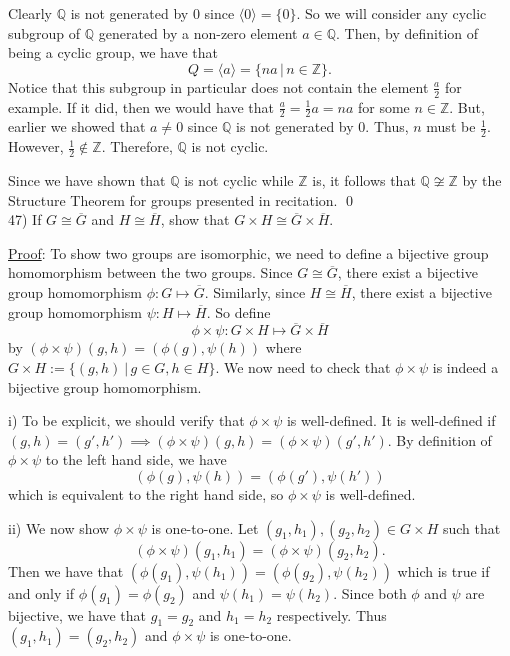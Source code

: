 \documentclass{article}
\begin{document}
Clearly $\mathbb{Q}$ is not generated by $0$ since $\langle 0 \rangle = \{ 0 \}$. So we will consider any cyclic subgroup of $\mathbb{Q}$ generated by a non-zero element $a \in \mathbb{Q}$. Then, by definition of being a cyclic group, we have that 
$$Q = \langle a \rangle = \{ na \, \vert\, n \in \mathbb{Z} \}.$$
Notice that this subgroup in particular does not contain the element $\frac{a}{2}$ for example. If it did, then we would have that $\frac{a}{2} = \frac{1}{2}a = na$ for some $n \in \mathbb{Z}$. But, earlier we showed that $a \neq 0$ since $\mathbb{Q}$ is not generated by $0$. Thus, $n$ must be $\frac{1}{2}$. However, $\frac{1}{2} \not \in \mathbb{Z}$. Therefore, $\mathbb{Q}$ is not cyclic.

Since we have shown that $\mathbb{Q}$ is not cyclic while $\mathbb{Z}$ is, it follows that $\mathbb{Q} \not \cong \mathbb{Z}$ by the Structure Theorem for groups presented in recitation. \qed \\

47) If $G \cong \overline{G}$ and $H \cong \overline{H}$, show that $G \times H \cong \overline{G} \times \overline{H}.$

\underline{Proof}: To show two groups are isomorphic, we need to define a bijective group homomorphism between the two groups.  Since $G \cong \overline{G}$, there exist a bijective group homomorphism $\phi : G \mapsto \overline{G}$. Similarly, since $H \cong \overline{H}$, there exist a bijective group homomorphism $\psi : H \mapsto \overline{H}$. So define 
$$\phi \times \psi : G \times H \mapsto \overline{G} \times \overline{H}$$
by $(\phi \times \psi)(g, h) = (\phi(g), \psi(h))$ where $G \times H := \{ (g,h) \ \vert\, g \in G, h \in H \}$. We now need to check that $\phi \times \psi$ is indeed a bijective group homomorphism.

i) To be explicit, we should verify that $\phi \times \psi$ is well-defined. It is well-defined if $(g, h) = (g', h') \implies (\phi \times \psi)(g, h) = (\phi \times \psi)(g', h').$ By definition of $\phi \times \psi$ to the left hand side, we have
$$(\phi(g), \psi(h)) = (\phi(g'), \psi(h'))$$
which is equivalent to the right hand side, so $\phi \times \psi$ is well-defined.

ii) We now show $\phi \times \psi$ is one-to-one. Let $(g_1, h_1), (g_2, h_2) \in G \times H$ such that 
$$(\phi \times \psi)(g_1, h_1) = (\phi \times \psi)(g_2, h_2).$$
Then we have that $(\phi(g_1), \psi(h_1)) = (\phi(g_2), \psi(h_2))$ which is true if and only if $\phi(g_1) = \phi(g_2)$ and $\psi(h_1) = \psi(h_2)$. Since both $\phi$ and $\psi$ are bijective, we have that $g_1 = g_2$ and $h_1 = h_2$ respectively. Thus $(g_1, h_1) = (g_2, h_2)$ and $\phi \times \psi$ is one-to-one.
\end{document}
